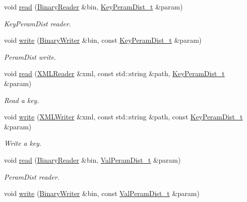 \begin{DoxyCompactItemize}
void \mbox{\hyperlink{namespaceHadron_ac70286e9fd2f4a9ddf81f9235d1812e8}{read}} (\mbox{\hyperlink{classADATIO_1_1BinaryReader}{Binary\+Reader}} \&bin, \mbox{\hyperlink{structHadron_1_1KeyPeramDist__t}{Key\+Peram\+Dist\+\_\+t}} \&param)
\begin{DoxyCompactList}\small\item\em Key\+Peram\+Dist reader. \end{DoxyCompactList}\item 
void \mbox{\hyperlink{namespaceHadron_a1f7e7b8c782fddd330a9f4491bd37e22}{write}} (\mbox{\hyperlink{classADATIO_1_1BinaryWriter}{Binary\+Writer}} \&bin, const \mbox{\hyperlink{structHadron_1_1KeyPeramDist__t}{Key\+Peram\+Dist\+\_\+t}} \&param)
\begin{DoxyCompactList}\small\item\em Peram\+Dist write. \end{DoxyCompactList}\item 
void \mbox{\hyperlink{namespaceHadron_a55b9ba85a8d8e17d95217275193fb013}{read}} (\mbox{\hyperlink{classADATXML_1_1XMLReader}{X\+M\+L\+Reader}} \&xml, const std\+::string \&path, \mbox{\hyperlink{structHadron_1_1KeyPeramDist__t}{Key\+Peram\+Dist\+\_\+t}} \&param)
\begin{DoxyCompactList}\small\item\em Read a key. \end{DoxyCompactList}\item 
void \mbox{\hyperlink{namespaceHadron_a9d260315c8fc49d172ff22fd3abb49c9}{write}} (\mbox{\hyperlink{classADATXML_1_1XMLWriter}{X\+M\+L\+Writer}} \&xml, const std\+::string \&path, const \mbox{\hyperlink{structHadron_1_1KeyPeramDist__t}{Key\+Peram\+Dist\+\_\+t}} \&param)
\begin{DoxyCompactList}\small\item\em Write a key. \end{DoxyCompactList}\item 
void \mbox{\hyperlink{namespaceHadron_a030f71bff6ae10166b42e24845e0dbf8}{read}} (\mbox{\hyperlink{classADATIO_1_1BinaryReader}{Binary\+Reader}} \&bin, \mbox{\hyperlink{structHadron_1_1ValPeramDist__t}{Val\+Peram\+Dist\+\_\+t}} \&param)
\begin{DoxyCompactList}\small\item\em Peram\+Dist reader. \end{DoxyCompactList}\item 
void \mbox{\hyperlink{namespaceHadron_afebbe26d622d0f830042509739bee2da}{write}} (\mbox{\hyperlink{classADATIO_1_1BinaryWriter}{Binary\+Writer}} \&bin, const \mbox{\hyperlink{structHadron_1_1ValPeramDist__t}{Val\+Peram\+Dist\+\_\+t}} \&param)

\end{DoxyCompactItemize}
